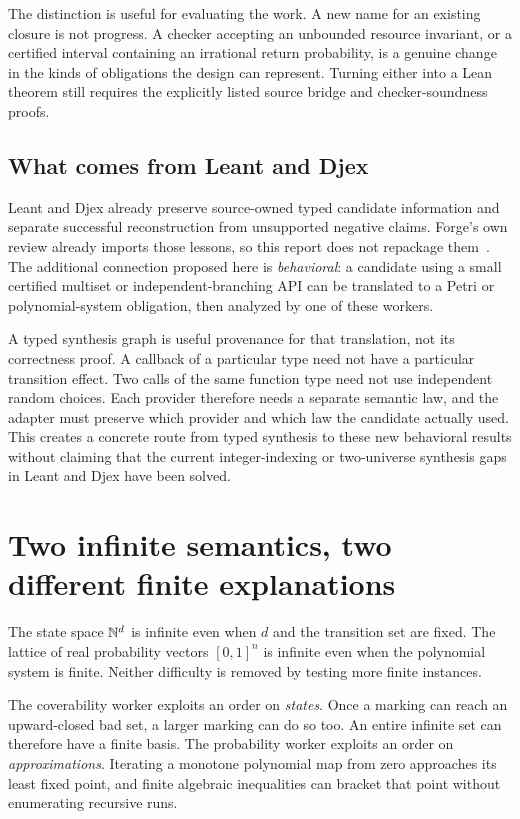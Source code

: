 The distinction is useful for evaluating the work. A new name for an existing closure is not progress. A checker accepting an unbounded resource invariant, or a certified interval containing an irrational return probability, is a genuine change in the kinds of obligations the design can represent. Turning either into a Lean theorem still requires the explicitly listed source bridge and checker-soundness proofs.

\subsection{What comes from Leant and Djex}
Leant and Djex already preserve source-owned typed candidate information and separate successful reconstruction from unsupported negative claims. Forge's own review already imports those lessons, so this report does not repackage them~\cite{forge-neighbors,leant,djex}. The additional connection proposed here is \emph{behavioral}: a candidate using a small certified multiset or independent-branching API can be translated to a Petri or polynomial-system obligation, then analyzed by one of these workers.

A typed synthesis graph is useful provenance for that translation, not its correctness proof. A callback of a particular type need not have a particular transition effect. Two calls of the same function type need not use independent random choices. Each provider therefore needs a separate semantic law, and the adapter must preserve which provider and which law the candidate actually used. This creates a concrete route from typed synthesis to these new behavioral results without claiming that the current integer-indexing or two-universe synthesis gaps in Leant and Djex have been solved.

\section{Two infinite semantics, two different finite explanations}
The state space $\mathbb N^d$ is infinite even when $d$ and the transition set are fixed. The lattice of real probability vectors $[0,1]^n$ is infinite even when the polynomial system is finite. Neither difficulty is removed by testing more finite instances.

The coverability worker exploits an order on \emph{states}. Once a marking can reach an upward-closed bad set, a larger marking can do so too. An entire infinite set can therefore have a finite basis. The probability worker exploits an order on \emph{approximations}. Iterating a monotone polynomial map from zero approaches its least fixed point, and finite algebraic inequalities can bracket that point without enumerating recursive runs.

